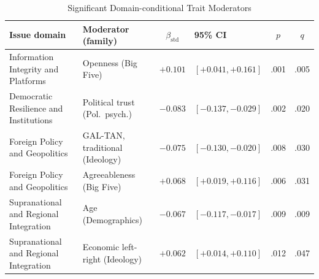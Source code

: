 \begin{table}[H]
\floatleft
\caption{Significant Domain-conditional Trait Moderators}
\label{tab:bydomain}
\vspace{2pt}
\begingroup\small
\begin{tabularx}{\linewidth}{@{}Yp{3.0cm}cp{2.4cm}cc@{}}
\toprule
Issue domain & Moderator (family) & $\beta_{\text{std}}$ & 95\% CI & $p$ & $q$ \\
\midrule
Information Integrity and Platforms & Openness (Big Five) & $+0.101$ & $[+0.041, +0.161]$ & .001 & .005 \\
Democratic Resilience and Institutions & Political trust (Pol.\ psych.) & $-0.083$ & $[-0.137, -0.029]$ & .002 & .020 \\
Foreign Policy and Geopolitics & GAL-TAN, traditional (Ideology) & $-0.075$ & $[-0.130, -0.020]$ & .008 & .030 \\
Foreign Policy and Geopolitics & Agreeableness (Big Five) & $+0.068$ & $[+0.019, +0.116]$ & .006 & .031 \\
Supranational and Regional Integration & Age (Demographics) & $-0.067$ & $[-0.117, -0.017]$ & .009 & .009 \\
Supranational and Regional Integration & Economic left-right (Ideology) & $+0.062$ & $[+0.014, +0.110]$ & .012 & .047 \\
\bottomrule
\end{tabularx}
\endgroup
{}
\end{table}
